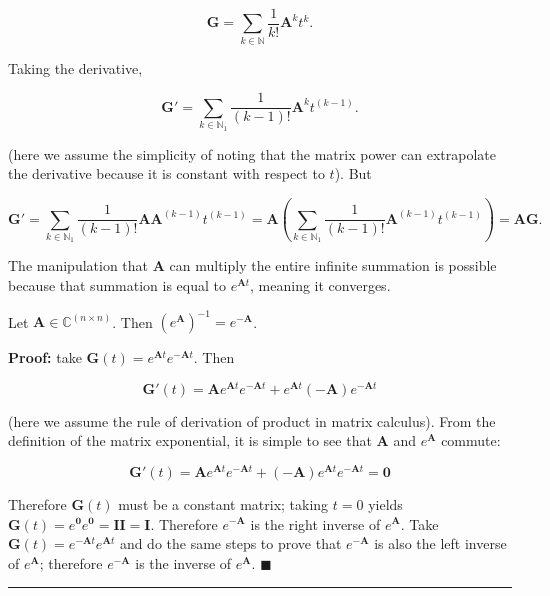 \begin{equation} \mathbf{G} = \sum\limits_{k\in\mathbb{N}} \dfrac{1}{k!}\mathbf{A}^k t^k .\end{equation}

	Taking the derivative,

\begin{equation} \mathbf{G}' = \sum\limits_{k\in\mathbb{N}_1} \dfrac{1}{(k-1)!}\mathbf{A}^k t^{(k-1)} .\end{equation}

	\noindent (here we assume the simplicity of noting that the matrix power can extrapolate the derivative because it is constant with respect to $t$). But

\begin{equation} \mathbf{G}' = \sum\limits_{k\in\mathbb{N}_1} \dfrac{1}{(k-1)!}\mathbf{A}\mathbf{A}^{(k-1)} t^{(k-1)} = \mathbf{A}\left(\sum\limits_{k\in\mathbb{N}_1} \dfrac{1}{(k-1)!}\mathbf{A}^{(k-1)} t^{(k-1)}\right) = \mathbf{AG}.\end{equation}

	The manipulation that $\mathbf{A}$ can multiply the entire infinite summation is possible because that summation is equal to $e^{\mathbf{A} t}$, meaning it converges.

\begin{theorem} \label{theo:matrix_exponential_inverse} %
	Let $\mathbf{A}\in\mathbb{C}^{(n\times n)}$. Then $\left(e^{\mathbf{A}}\right)^{-1} = e^{-\mathbf{A}}$.
\end{theorem}
\noindent \textbf{Proof:} take $\mathbf{G}(t) = e^{\mathbf{A}t}e^{-\mathbf{A}t}$. Then

\begin{equation} \mathbf{G}'(t) = \mathbf{A}e^{\mathbf{A}t}e^{-\mathbf{A}t} + e^{\mathbf{A}t}\left(-\mathbf{A}\right)e^{-\mathbf{A}t} \end{equation}

	\noindent (here we assume the rule of derivation of product in matrix calculus). From the definition of the matrix exponential, it is simple to see that $\mathbf{A}$ and $e^{\mathbf{A}}$ commute:

\begin{equation} \mathbf{G}'(t) = \mathbf{A}e^{\mathbf{A}t}e^{-\mathbf{A}t} + \left(-\mathbf{A}\right)e^{\mathbf{A}t}e^{-\mathbf{A}t} = \mathbf{0} \end{equation}

	Therefore $\mathbf{G}(t)$ must be a constant matrix; taking $t=0$ yields $\mathbf{G}(t) = e^{\mathbf{0}}e^{\mathbf{0}} = \mathbf{II} = \mathbf{I}$. Therefore $e^{-\mathbf{A}}$ is the right inverse of $e^{\mathbf{A}}$. Take $\mathbf{G}(t) = e^{-\mathbf{A}t}e^{\mathbf{A}t}$ and do the same steps to prove that $e^{-\mathbf{A}}$ is also the left inverse of $e^{\mathbf{A}}$; therefore $e^{-\mathbf{A}}$ is the inverse of $e^{\mathbf{A}}$.
\hfill$\blacksquare$
\vspace{5mm}
\hrule
\vspace{5mm} %

